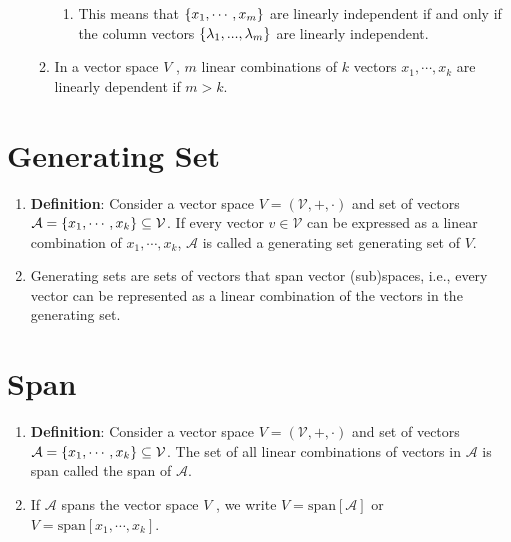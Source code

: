 \begin{enumerate}
\begin{enumerate}
\begin{enumerate}
            \item This means that $\left\{x_1, \cdots , x_m\right\}$ are linearly independent if and only if the column vectors $\left\{\lambda_1, . . . , \lambda_m\right\}$ are linearly independent.
            \hfill \cite{mfml/book/mml/Deisenroth-Faisal-Ong}
        \end{enumerate}

        \item In a vector space $V$ , $m$ linear combinations of $k$ vectors $x_1, \cdots , x_k$ are linearly dependent if $m > k$.
        \hfill \cite{mfml/book/mml/Deisenroth-Faisal-Ong}
    \end{enumerate}
\end{enumerate}



\section{Generating Set}

\begin{enumerate}
    \item \textbf{Definition}: Consider a vector space $V = (\mathcal{V}, +, \cdot)$ and set of vectors $\mathcal{A} = \left\{x_1, \cdots , x_k\right\} \subseteq \mathcal{V}$. 
    If every vector $v \in \mathcal{V}$ can be expressed as a linear combination of $x_1, \cdots , x_k$, $\mathcal{A}$ is called a generating set generating set of $V$.
    \hfill \cite{mfml/book/mml/Deisenroth-Faisal-Ong}

    \item Generating sets are sets of vectors that span vector (sub)spaces, i.e., every vector can be represented as a linear combination of the vectors in the generating set.
    \hfill \cite{mfml/book/mml/Deisenroth-Faisal-Ong}
\end{enumerate}








\section{Span}

\begin{enumerate}
    \item \textbf{Definition}: Consider a vector space $V = (\mathcal{V}, +, \cdot)$ and set of vectors $\mathcal{A} = \left\{x_1, \cdots , x_k\right\} \subseteq \mathcal{V}$. 
    The set of all linear combinations of vectors in $\mathcal{A}$ is span called the span of $\mathcal{A}$.
    \hfill \cite{mfml/book/mml/Deisenroth-Faisal-Ong}

    \item If $\mathcal{A}$ spans the vector space $V$ , we write $V = \text{span}[\mathcal{A}]$ or $V = \text{span}[x_1, \cdots , x_k]$.
    \hfill \cite{mfml/book/mml/Deisenroth-Faisal-Ong}

    
\end{enumerate}





